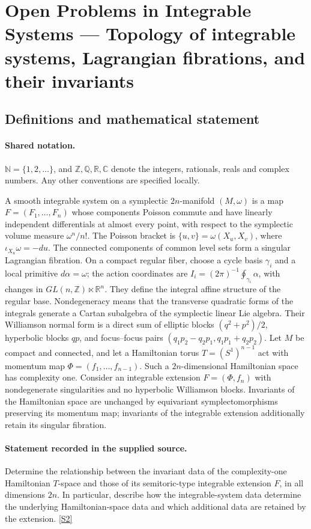 \documentclass[11pt]{article}
\newcommand{\sref}[2]{\hyperlink{source:#1:#2}{[S#2]}}
\begin{document}
\section{Open Problems in Integrable Systems — Topology of integrable systems, Lagrangian fibrations, and their invariants}\label{statement}

\subsection{Definitions and mathematical statement}

\paragraph{Shared notation.}$\mathbb N=\{1,2,\ldots\}$, and $\mathbb Z,\mathbb Q,\mathbb R,\mathbb C$ denote the integers, rationals, reals and complex numbers. Any other conventions are specified locally.


A smooth integrable system on a symplectic $2n$-manifold $(M,\omega)$ is a map $F=(F_1,\ldots,F_n)$ whose components Poisson commute and have linearly independent differentials at almost every point, with respect to the symplectic volume measure $\omega^n/n!$. The Poisson bracket is $\{u,v\}=\omega(X_u,X_v)$, where $\iota_{X_u}\omega=-du$. The connected components of common level sets form a singular Lagrangian fibration. On a compact regular fiber, choose a cycle basis $\gamma_i$ and a local primitive $d\alpha=\omega$; the action coordinates are $I_i=(2\pi)^{-1}\oint_{\gamma_i}\alpha$, with changes in $GL(n,\mathbb Z)\ltimes\mathbb R^n$. They define the integral affine structure of the regular base. Nondegeneracy means that the transverse quadratic forms of the integrals generate a Cartan subalgebra of the symplectic linear Lie algebra. Their Williamson normal form is a direct sum of elliptic blocks $(q^2+p^2)/2$, hyperbolic blocks $qp$, and focus--focus pairs $(q_1p_2-q_2p_1,q_1p_1+q_2p_2)$. Let $M$ be compact and connected, and let a Hamiltonian torus $T=(S^1)^{n-1}$ act with momentum map $\Phi=(f_1,\ldots,f_{n-1})$. Such a $2n$-dimensional Hamiltonian space has complexity one. Consider an integrable extension $F=(\Phi,f_n)$ with nondegenerate singularities and no hyperbolic Williamson blocks. Invariants of the Hamiltonian space are unchanged by equivariant symplectomorphisms preserving its momentum map; invariants of the integrable extension additionally retain its singular fibration.
\paragraph{Statement recorded in the supplied source.}
Determine the relationship between the invariant data of the complexity-one Hamiltonian $T$-space and those of its semitoric-type integrable extension $F$, in all dimensions $2n$. In particular, describe how the integrable-system data determine the underlying Hamiltonian-space data and which additional data are retained by the extension. \sref{statement}{2}
\end{document}
